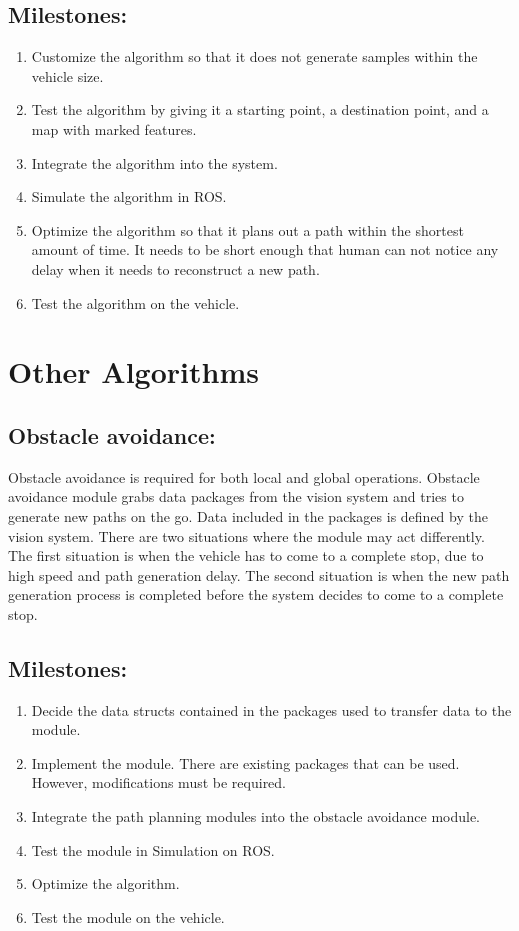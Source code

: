 \documentclass[compsoc,draftclsnofoot,onecolumn,10pt]{IEEEtran}
\begin{document}
\subsection{Milestones:}
\begin{enumerate}
	\item Customize the algorithm so that it does not generate samples within the vehicle size.
	\item Test the algorithm by giving it a starting point, a destination point, and a map with marked features.
	\item Integrate the algorithm into the system.  
	\item Simulate the algorithm in ROS.
	\item Optimize the algorithm so that it plans out a path within the shortest amount of time. It needs to be short enough that human can not notice any delay when it needs to reconstruct a new path.
	\item Test the algorithm on the vehicle.
\end{enumerate}

\section{Other Algorithms}
\subsection{Obstacle avoidance:}
Obstacle avoidance is required for both local and global operations. Obstacle avoidance module grabs data packages from the vision system and tries to generate new paths on the go. Data included in the packages is defined by the vision system. There are two situations where the module may act differently. The first situation is when the vehicle has to come to a complete stop, due to high speed and path generation delay. The second situation is when the new path generation process is completed before the system decides to come to a complete stop.\par
\subsection{Milestones:}
\begin{enumerate}
	\item Decide the data structs contained in the packages used to transfer data to the module.
	\item Implement the module. There are existing packages that can be used. However, modifications must be required.
	\item Integrate the path planning modules into the obstacle avoidance module.
	\item Test the module in Simulation on ROS.
	\item Optimize the algorithm.
	\item Test the module on the vehicle.
\end{enumerate}
\end{document}
